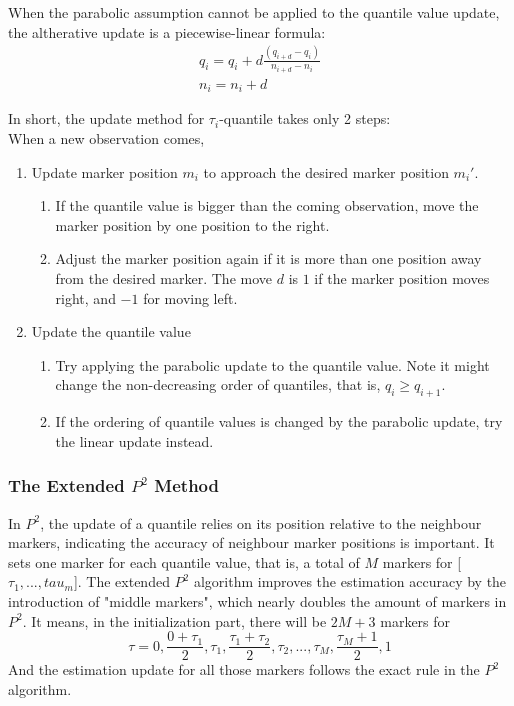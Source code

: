When the parabolic assumption cannot be applied to the quantile value update, the altherative update is a piecewise-linear formula:
\begin{equation}
    \begin{array}{l}
    q_{i}=q_{i}+d \frac{\left(q_{i+d}-q_{i}\right)}{n_{i+d}-n_{i}} \\
    n_{i}=n_{i}+d
    \end{array}
\end{equation}

In short, the update method for $\tau_i$-quantile takes only 2 steps:\\
When a new observation comes,
\begin{enumerate}
    \item Update marker position $m_i$ to approach the desired marker position $m_i \prime$.
    \begin{enumerate}
        \item If the quantile value is bigger than the coming observation, move the marker position by one position to the right.
        \item Adjust the marker position again if it is more than one position away from the desired marker. The move $d$ is $1$ if the marker position moves right, and $-1$ for moving left.
    \end{enumerate}
    \item Update the quantile value
    \begin{enumerate}
        \item Try applying the parabolic update to the quantile value. Note it might change the non-decreasing order of quantiles, that is, $q_i \geq q_{i+1}$.
        \item If the ordering of quantile values is changed by the parabolic update, try the linear update instead.
    \end{enumerate}
\end{enumerate}


\subsubsection{The Extended $P^2$ Method}
In $P^2$, the update of a quantile relies on its position relative to the neighbour markers, indicating the accuracy of neighbour marker positions is important. 
It sets one marker for each quantile value, that is, a total of $M$ markers for [$\tau_1, ..., tau_m$].
The extended $P^2$ algorithm improves the estimation accuracy by the introduction of "middle markers",  which nearly doubles the amount of markers in $P^2$. 
It means, in the initialization part, there will be $2M+3$ markers for
$$
\tau = 0, \frac{0+\tau_1}{2}, \tau_1, \frac{\tau_1 + \tau_2}{2}, \tau_2, ..., \tau_{M}, \frac{\tau_M+1}{2}, 1
$$
And the estimation update for all those markers follows the exact rule in the $P^2$ algorithm.


